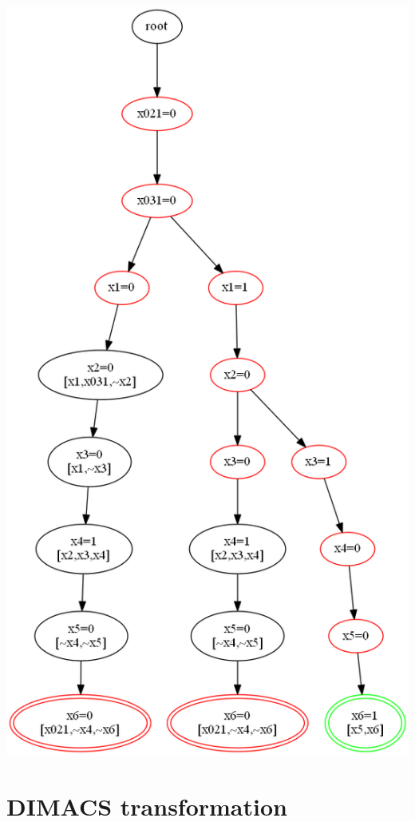 \documentclass[11pt]{article}
\begin{document}
\begin{center}
\includegraphics[keepaspectratio=true,height=.7\textheight]{tree1-color}
\end{center}

\section{DIMACS transformation}
\end{document}
